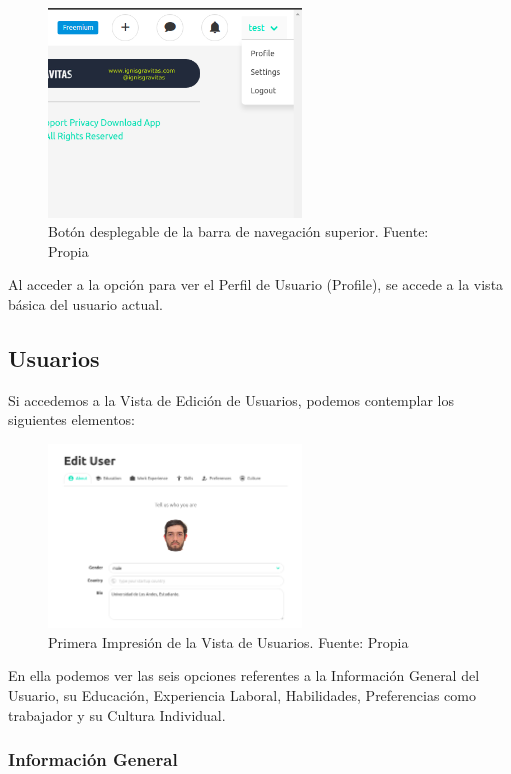 \begin{figure}[H]
\centering
\includegraphics[width=0.60\textwidth]{img/19.png}
\caption{Botón desplegable de la barra de navegación superior.
Fuente: Propia}
\label{figure:dropdown}
\end{figure}

Al acceder a la opción para ver el Perfil de Usuario (Profile), se accede a la vista básica del usuario actual.

\subsection{Usuarios}

Si accedemos a la Vista de Edición de Usuarios, podemos contemplar los siguientes elementos:

\begin{figure}[H]
\centering
\includegraphics[width=0.60\textwidth]{img/20.png}
\caption{Primera Impresión de la Vista de Usuarios. Fuente: Propia}
\label{figure:usersView}
\end{figure}

En ella podemos ver las seis opciones referentes a la Información General del Usuario, su Educación, Experiencia Laboral, Habilidades, Preferencias como trabajador y su Cultura Individual.

\subsubsection{Información General}

